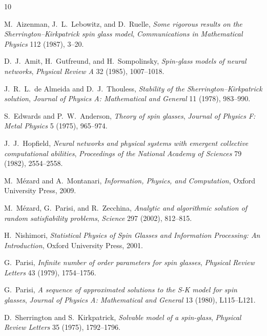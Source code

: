 \documentclass[11pt]{article}
\numberwithin{equation}{section}
\newcommand{\1}{\mathbf 1}
\begin{document}
\begin{thebibliography}{10}

M.~Aizenman, J.~L.~Lebowitz, and D.~Ruelle,
\newblock
\emph{Some rigorous results on the Sherrington--Kirkpatrick spin glass model},
\newblock \emph{Communications in Mathematical Physics} 112 (1987), 3--20.

D.~J.~Amit, H.~Gutfreund, and H.~Sompolinsky,
\newblock
\emph{Spin-glass models of neural networks},
\newblock \emph{Physical Review A} 32 (1985), 1007--1018.

J.~R.~L.~de Almeida and D.~J.~Thouless,
\newblock
\emph{Stability of the Sherrington--Kirkpatrick solution},
\newblock \emph{Journal of Physics A: Mathematical and General} 11 (1978), 983--990.

S.~Edwards and P.~W.~Anderson,
\newblock
\emph{Theory of spin glasses},
\newblock \emph{Journal of Physics F: Metal Physics} 5 (1975), 965--974.

J.~J.~Hopfield,
\newblock
\emph{Neural networks and physical systems with emergent collective computational abilities},
\newblock \emph{Proceedings of the National Academy of Sciences} 79 (1982), 2554--2558.

M.~M{\'e}zard and A.~Montanari,
\newblock
\emph{Information, Physics, and Computation},
\newblock Oxford University Press, 2009.

M.~M{\'e}zard, G.~Parisi, and R.~Zecchina,
\newblock
\emph{Analytic and algorithmic solution of random satisfiability problems},
\newblock \emph{Science} 297 (2002), 812--815.

H.~Nishimori,
\newblock
\emph{Statistical Physics of Spin Glasses and Information Processing: An Introduction},
\newblock Oxford University Press, 2001.

G.~Parisi,
\newblock
\emph{Infinite number of order parameters for spin glasses},
\newblock \emph{Physical Review Letters} 43 (1979), 1754--1756.

G.~Parisi,
\newblock
\emph{A sequence of approximated solutions to the S-K model for spin glasses},
\newblock \emph{Journal of Physics A: Mathematical and General} 13 (1980), L115--L121.

D.~Sherrington and S.~Kirkpatrick,
\newblock
\emph{Solvable model of a spin-glass},
\newblock \emph{Physical Review Letters} 35 (1975), 1792--1796.


\end{thebibliography}
\end{document}
